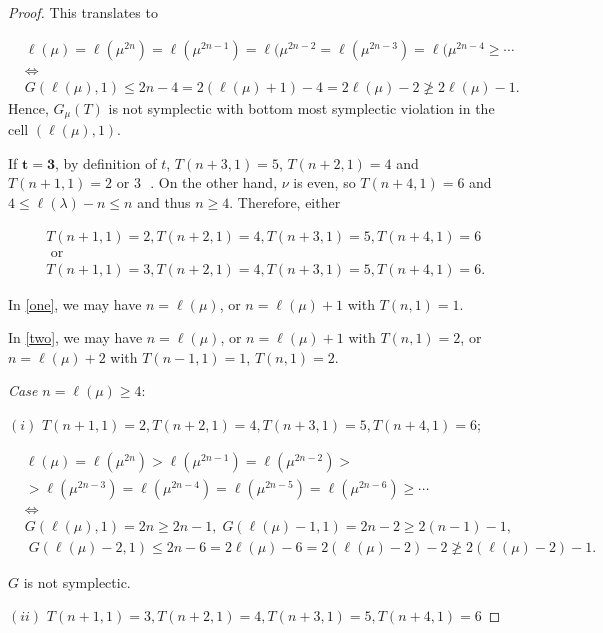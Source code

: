 \documentclass[10pt,a4paper]{amsart}
\begin{document}
\begin{proof}
This translates to

\begin{align*}&\ell(\mu)=\ell(\mu^{2n})=\ell(\mu^{2n-1})=\ell(\mu^{2n-2}=\ell(\mu^{2n-3})=\ell(\mu^{2n-4}\ge\cdots\nonumber \\
&\Leftrightarrow\\
 &G(\ell(\mu),1)\le 2n-4=2(\ell(\mu)+1)-4=2\ell(\mu)-2\ngeq 2\ell(\mu)-1.
\end{align*}
Hence,  $G_\mu(T)$ is not symplectic with bottom most symplectic violation in the cell $(\ell(\mu),1)$.
\medskip

\iffalse
If $\mathbf{t=3}$, by definition of $t$, $T(n+3,1)=5$, $T(n+2,1)=4$ and $T(n+1,1)=2 \mbox{ or $3$ }$. On the other hand, $\nu$ is even,  so $T(n+4,1)=6$ and $4\le \ell(\lambda)-n\le n$ and thus $n\ge 4$. Therefore, either

\begin{align}&T(n+1,1)=2, T(n+2,1)=4, T(n+3,1)=5, T(n+4,1)=6  \label{one}\\
&\mbox{ or}\nonumber\\
&T(n+1,1)=3, T(n+2,1)=4, T(n+3,1)=5, T(n+4,1)=6.\label{two}
\end{align}

In \eqref{one}, we may have $n=\ell(\mu)$, or $n=\ell(\mu)+1$ with $T(n,1)=1$.

In \eqref{two}, we may have $n=\ell(\mu)$, or $n=\ell(\mu)+1$ with $T(n,1)=2$, or $n=\ell(\mu)+2$ with $T(n-1,1)=1$, $T(n,1)=2$.

\medskip
\emph{Case $n=\ell(\mu)\ge 4$}:

$(i)$ $T(n+1,1)=2, T(n+2,1)=4, T(n+3,1)=5, T(n+4,1)=6$;

\begin{align*}&\ell(\mu)=\ell(\mu^{2n})>\ell(\mu^{2n-1})=\ell(\mu^{2n-2})>\nonumber
\\
&>\ell(\mu^{2n-3})=\ell(\mu^{2n-4})=\ell(\mu^{2n-5})=\ell(\mu^{2n-6})\ge\cdots\nonumber \\
&\Leftrightarrow\\
&G(\ell(\mu),1)=2n\ge 2n-1,\; G(\ell(\mu)-1,1)=2n-2\ge 2(n-1)-1,\\
&\;G(\ell(\mu)-2,1)\le 2n-6=2\ell(\mu)-6=2(\ell(\mu)-2)-2\ngeq 2(\ell(\mu)-2)-1.
\end{align*}

$G$ is not symplectic.

\medskip
$(ii)$ $T(n+1,1)=3, T(n+2,1)=4, T(n+3,1)=5, T(n+4,1)=6$


\end{proof}
\end{document}
